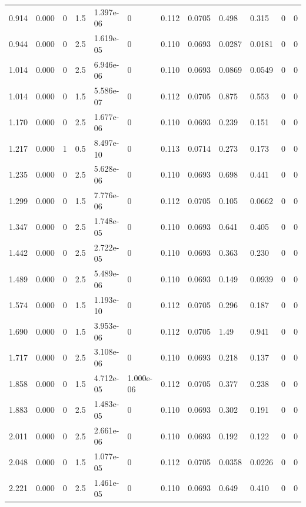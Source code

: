 \documentclass[preview]{standalone}
\begin{document}
{{\begin{tabular}{L{1.2cm}C{1.2cm} C{0.3cm}C{0.5cm} C{1.4cm}C{1.4cm} C{1.4cm}C{1.4cm} C{1.6cm}C{1.6cm} C{1.6cm}C{1.6cm}}
  0.914  &  0.000  & 0     & 1.5 &  1.397e-06  & 0  &  0.112&   0.0705& 0.498 & 0.315   &  0 & 0  \\ 
  0.944  &  0.000  & 0     & 2.5 &  1.619e-05  & 0  &  0.110&   0.0693& 0.0287 & 0.0181   &  0 & 0  \\ 
  1.014  &  0.000  & 0     & 2.5 &  6.946e-06  & 0  &  0.110&   0.0693& 0.0869 & 0.0549   &  0 & 0  \\ 
  1.014  &  0.000  & 0     & 1.5 &  5.586e-07  & 0  &  0.112&   0.0705& 0.875 & 0.553   &  0 & 0  \\ 
  1.170  &  0.000  & 0     & 2.5 &  1.677e-06  & 0  &  0.110&   0.0693& 0.239 & 0.151   &  0 & 0  \\ 
  1.217  &  0.000  & 1     & 0.5 &  8.497e-10  & 0  &  0.113&   0.0714& 0.273 & 0.173   &  0 & 0  \\ 
  1.235  &  0.000  & 0     & 2.5 &  5.628e-06  & 0  &  0.110&   0.0693& 0.698 & 0.441   &  0 & 0  \\ 
  1.299  &  0.000  & 0     & 1.5 &  7.776e-06  & 0  &  0.112&   0.0705& 0.105 & 0.0662   &  0 & 0  \\ 
  1.347  &  0.000  & 0     & 2.5 &  1.748e-05  & 0  &  0.110&   0.0693& 0.641 & 0.405   &  0 & 0  \\ 
  1.442  &  0.000  & 0     & 2.5 &  2.722e-05  & 0  &  0.110&   0.0693& 0.363 & 0.230   &  0 & 0  \\ 
  1.489  &  0.000  & 0     & 2.5 &  5.489e-06  & 0  &  0.110&   0.0693& 0.149 & 0.0939   &  0 & 0  \\ 
  1.574  &  0.000  & 0     & 1.5 &  1.193e-10  & 0  &  0.112&   0.0705& 0.296 & 0.187   &  0 & 0  \\ 
  1.690  &  0.000  & 0     & 1.5 &  3.953e-06  & 0  &  0.112&   0.0705& 1.49 & 0.941   &  0 & 0  \\ 
  1.717  &  0.000  & 0     & 2.5 &  3.108e-06  & 0  &  0.110&   0.0693& 0.218 & 0.137   &  0 & 0  \\ 
  1.858  &  0.000  & 0     & 1.5 &  4.712e-05  & 1.000e-06  &  0.112&   0.0705& 0.377 & 0.238   &  0 & 0  \\ 
  1.883  &  0.000  & 0     & 2.5 &  1.483e-05  & 0  &  0.110&   0.0693& 0.302 & 0.191   &  0 & 0  \\ 
  2.011  &  0.000  & 0     & 2.5 &  2.661e-06  & 0  &  0.110&   0.0693& 0.192 & 0.122   &  0 & 0  \\ 
  2.048  &  0.000  & 0     & 1.5 &  1.077e-05  & 0  &  0.112&   0.0705& 0.0358 & 0.0226   &  0 & 0  \\ 
  2.221  &  0.000  & 0     & 2.5 &  1.461e-05  & 0  &  0.110&   0.0693& 0.649 & 0.410   &  0 & 0  \\ 

\end{tabular}}}
\end{document}
